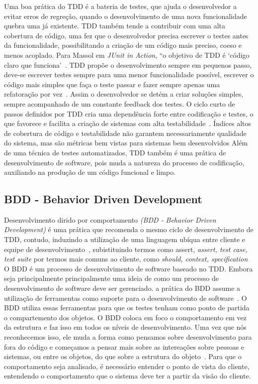 Uma boa prática do TDD é a bateria de testes, que ajuda o desenvolvedor a evitar 
erros de regreção, quando o desenvolvimento de uma nova funcionalidade quebra uma 
já existente. TDD também tende a contribuir com uma alta cobertura de código, uma 
fez que o desenvolvedor precisa escrever o testes antes da funcionalidade, 
possibilitando a criação de um código mais preciso, coeso e menos acoplado. 
%
Para Massol em \textit{JUnit in Action}, “o objetivo de TDD é ‘código claro que 
funciona’~\cite{massol2003}.
%
TDD propõe o desenvolvimento sempre em pequenos passo, deve-se escrever testes sempre 
para uma menor funcionalidade possível, escrever o código mais simples que faça o 
teste passar e fazer sempre apenas uma refatoração por vez~\cite{beck2002}. Assim o 
desenvolvedor se detém a criar soluções simples, sempre acompanhado de um constante 
feedback dos testes.
%
O ciclo curto de passos definidos por TDD cria uma dependência forte entre codificação 
e testes, o que favorece e facilita a criação de sistemas com alta testabilidade~\cite{bernardo2011}. 
Índices altos de cobertura de código e testabilidade não garantem necessariamente 
qualidade do sistema, mas são métricas bem vistas para sistemas bem desenvolvidos
%
Além de uma técnica de testes automatizados, TDD também é uma prática de desenvolvimento 
de software, pois muda a natureza do processo de codificação, auxiliando na produção 
de um código funcional e limpo.
%

\subsection{BDD - Behavior Driven Development}
Desenvolvimento dirido por comportamento \textit{(BDD - Behavior Driven Development)} 
é uma prática que recomenda o mesmo ciclo de desenvolvimento de TDD, contudo, induzindo 
a utilização de uma linguagem ubíqua entre cliente e equipe de desenvolvimento~\cite{bernardo2011}, subistituindo termos como assert, \textit{assert, test case, test suite} por termos 
mais comuns ao cliente, como \textit{should, context, specification}
%
O BDD é um processo de desenvolvimento de software baseado no TDD. Embora seja 
principalmente principalmente uma ideia de como um processo de desenvolvimento de 
software deve ser gerenciado. a prática do BDD assume a utilização de ferramentas 
como suporte para o desenvolvimento de software~\cite{haring2011}. O BDD utiliza 
essas ferramentas para que os testes tenham como ponto de partida o compartemento 
dos objetos.
%
O BDD coloca em foco o comportamento em vez da estrutura e faz isso em todos os 
níveis de desenvolvimento. Uma vez que nós reconhecemos isso, ele muda a forma 
como pensamos sobre desenvolvimento para fora do código e começamos a pensar mais 
sobre as intereações sobre pessoas e sistemas, ou entre os objetos, do que sobre a 
estrutura do objeto~\cite{chelimsky2010}.
%
Para que o comportamento seja analisado, é necessário entender o ponto de vista do 
cliente, entendendo o comportamento que o sistema deve ter a partir da visão do cliente. 
%
